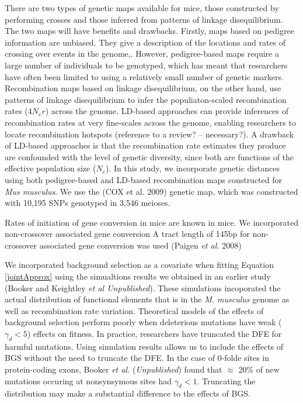 \documentclass[11pt]{article}
\begin{document}
	There are two types of genetic maps available for mice, those constructed by performing crosses and those inferred from patterns of linkage disequilibrium. The two maps will have benefits and drawbacks. Firstly, maps based on pedigree information are unbiased. They give a description of the locations and rates of crossing over events in the genome,. However, pedigree-based maps require a large number of individuals to be genotyped, which has meant that researchers have often been limited to using a relatively small number of genetic markers. Recombination maps based on linkage disequilibrium, on the other hand, use patterns of linkage disequilibrium to infer the populiaton-scaled recombination rates ($4N_er$) across the genome. LD-based approaches can provide inferences of recombination rates at very fine-scales across the genome, enabling researchers to locate recombination hotspots (reference to a review? – necessary?). A drawback of LD-based approaches is that the recombination rate estimates they produce are confounded with the level of genetic diversity, since both are functions of the effective population size ($N_e$). In this study, we incorporate genetic distances using both pedigree-based and LD-based recombination maps constructed for \emph{Mus musculus}. We use the (COX et al. 2009) genetic map, which was constructed with 10,195 SNPs genotyped in 3,546 meioses. 


	Rates of initiation of gene conversion in mice are known in mice. We incorporated non-crossover associated gene conversion 
A tract length of 145bp for non-crossover associated gene conversion was used (Paigen \textit{et al.} 2008)
 
 
 	We incorporated background selection as a covariate when fitting Equation \ref{jointApprox} using the simualtions results we obtained in an earlier study (Booker and Keightley \textit{et al Unpublished}). These simulations incoporated the actual distribution of functional elements that is in the \textit{M. musculus} genome as well as recombination rate variation. Theoretical models of the effects of background selection perform poorly when deleterious mutations have weak ($\gamma_d < 5$) 	effects on fitness. In practice, researchers have truncated the DFE for harmful mutations. Using simulation results allows us to include the effects of BGS without the need to truncate the DFE. In the case of 0-folde sites in protein-coding exons, Booker \textit{et al.} (\textit{Unpublished}) found that $\approx$ 20\% of new mutations occuring at nonsynsymous sites had $\gamma_d < 1$. Truncating the distribution may make a substantial difference to the effects of BGS. 
 	
\end{document}
